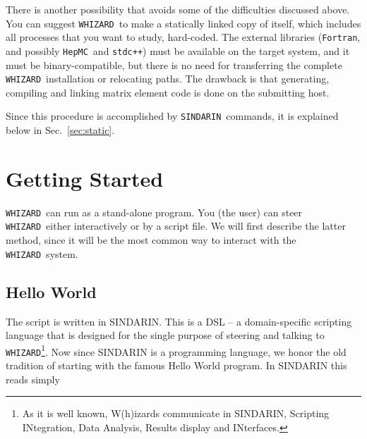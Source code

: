 \documentclass[12pt]{book}
\newcommand{\ttt}[1]{\texttt{#1}}
\newcommand{\whizard}{\texttt{WHIZARD}}
\newcommand{\hepmc}{\texttt{HepMC}}
\newcommand{\sindarin}{\texttt{SINDARIN}}
\newcommand{\fortran}{\texttt{Fortran}}
\begin{document}
There is another possibility that avoids some of the difficulties
discussed above.  You can suggest \whizard\ to make a statically
linked copy of itself, which includes all processes that you want to
study, hard-coded.  The external libraries (\fortran, and possibly
\hepmc\ and \ttt{stdc++}) must be available on the target system, and
it must be binary-compatible, but there is no need for transferring
the complete \whizard\ installation or relocating paths.  The drawback
is that generating, compiling and linking matrix element code is done
on the submitting host.

Since this procedure is accomplished by \sindarin\ commands, it is
explained below in Sec.~\ref{sec:static}.




\clearpage

\chapter{Getting Started}
\label{sec:start}

\whizard\ can run as a stand-alone program.  You (the user) can steer
\whizard\ either interactively or by a script file.  We will first
describe the latter method, since it will be the most common way to
interact with the \whizard\ system.

\section{Hello World}

The script is written in SINDARIN.  This is a DSL -- a domain-specific
scripting language that is designed for the single purpose of steering and
talking to \whizard\footnote{As it is well known, W(h)izards communicate in
  SINDARIN, Scripting INtegration, Data Analysis, Results display and
  INterfaces.}.  Now since SINDARIN is a programming language, we honor the old
tradition of starting with the famous Hello World program.  In SINDARIN this
reads simply

\end{document}
